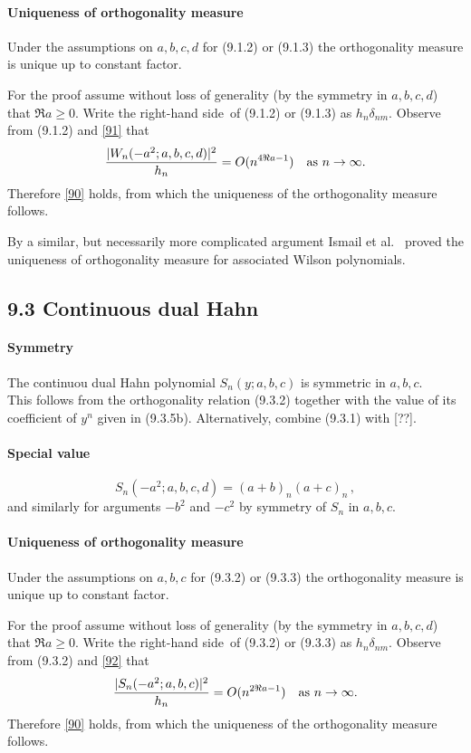 \documentclass[twoside,11pt]{article}
\newcommand\de\delta
\newcommand\iy\infty
\newcommand\RHS{right-hand side}
\begin{document}
\paragraph{Uniqueness of orthogonality measure}
Under the assumptions on $a,b,c,d$ for (9.1.2) or (9.1.3) the orthogonality
measure is unique up to constant factor.

For the proof assume without
loss of generality (by the symmetry in $a,b,c,d$) that $\Re a\ge0$.
Write the \RHS\ of (9.1.2) or (9.1.3) as $h_n\de_{nm}$.
Observe from (9.1.2) and \eqref{91} that
\[
\frac{|W_n(-a^2;a,b,c,d)|^2}{h_n} = O(n^{4\Re a-1})\quad\hbox{as $n\to\iy$.}
\]
Therefore \eqref{90} holds, from which the uniqueness of the orthogonality
measure follows.

By a similar, but necessarily more complicated argument Ismail et al.\
\cite[Section 3]{281} proved the uniqueness of orthogonality measure for
associated Wilson polynomials.
%
\subsection*{9.3 Continuous dual Hahn}
%
\paragraph{Symmetry}
The continuou dual Hahn polynomial $S_n(y;a,b,c)$ is symmetric
in $a,b,c$.\\
This follows from the orthogonality relation (9.3.2)
together with the value of its coefficient of $y^n$ given in (9.3.5b).
Alternatively, combine (9.3.1) with [??].
%
\paragraph{Special value}
\begin{equation}
S_n(-a^2;a,b,c,d)=(a+b)_n(a+c)_n\,,
\label{92}
\end{equation}
and similarly for arguments $-b^2$ and $-c^2$ by symmetry of $S_n$ in $a,b,c$.
%
\paragraph{Uniqueness of orthogonality measure}
Under the assumptions on $a,b,c$ for (9.3.2) or (9.3.3) the orthogonality
measure is unique up to constant factor.

For the proof assume without
loss of generality (by the symmetry in $a,b,c,d$) that $\Re a\geq0$.
Write the \RHS\ of (9.3.2) or (9.3.3) as $h_n\de_{nm}$.
Observe from (9.3.2) and \eqref{92} that
\[
\frac{|S_n(-a^2;a,b,c)|^2}{h_n} = O(n^{2\Re a-1})\quad
\hbox{as $n\to\iy$.}
\]
Therefore \eqref{90} holds, from which the uniqueness of the orthogonality
measure follows.
%
\end{document}
